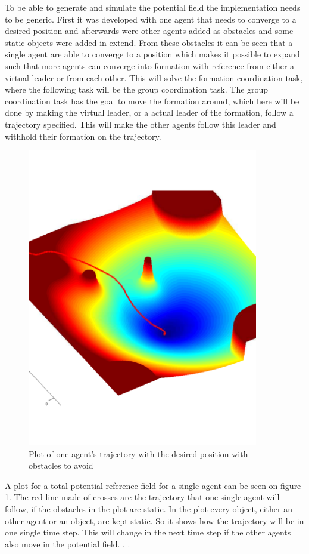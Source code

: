 To be able to generate and simulate the potential field the implementation needs to be generic. First it was developed with one agent that needs to converge to a desired position and afterwards were other agents added as obstacles and some static objects were added in extend. From these obstacles it can be seen that a single agent are able to converge to a position which makes it possible to expand such that more agents can converge into formation with reference from either a virtual leader or from each other. This will solve the formation coordination task, where the following task will be the group coordination task. The group coordination task has the goal to move the formation around, which here will be done by making the virtual leader, or a actual leader of the formation, follow a trajectory specified. This will make the other agents follow this leader and withhold their formation on the trajectory.
\begin{figure}[htbp]
  \includegraphics[width=0.9\textwidth]{../../code/matlab/ftotmagnfig1}
  \caption{Plot of one agent's trajectory with the desired position with obstacles to avoid}
  \label{fig:potfieldagenti}
\end{figure}
A plot for a total potential reference field for a single agent can be seen on figure \ref{fig:potfieldagenti}. The red line made of crosses are the trajectory that one single agent will follow, if the obstacles in the plot are static. In the plot every object, either an other agent or an object, are kept static. So it shows how the trajectory will be in one single time step. This will change in the next time step if the other agents also move in the potential field. . .



